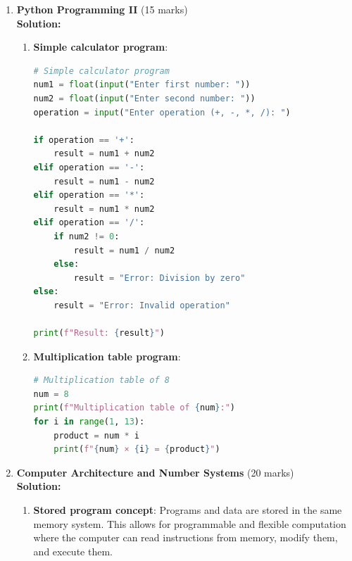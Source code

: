 \documentclass[12pt]{article}
\begin{document}
\begin{enumerate}[left=0pt, label=\bfseries Q\arabic*., start=1]
\begin{enumerate}[label=(\alph*)]
        \item \textbf{Can -132 be represented in 8-bit?}:
        \begin{align*}
        \text{Range for signed 8-bit} &= -2^{7} \text{ to } 2^{7}-1 \\
        &= -128 \text{ to } 127 \\
        -132 &< -128 \\
        \text{Answer} &= \boxed{\text{No, -132 is outside the representable range of -128 to 127}}
        \end{align*}
    \end{enumerate}

    \item \textbf{Python Programming II} \hfill (15 marks)\\
    \textbf{Solution:}
    \begin{enumerate}[label=(\alph*)]
        \item \textbf{Simple calculator program}:
        \begin{lstlisting}[language=Python]
# Simple calculator program
num1 = float(input("Enter first number: "))
num2 = float(input("Enter second number: "))
operation = input("Enter operation (+, -, *, /): ")

if operation == '+':
    result = num1 + num2
elif operation == '-':
    result = num1 - num2
elif operation == '*':
    result = num1 * num2
elif operation == '/':
    if num2 != 0:
        result = num1 / num2
    else:
        result = "Error: Division by zero"
else:
    result = "Error: Invalid operation"

print(f"Result: {result}")
        \end{lstlisting}
        
        \item \textbf{Multiplication table program}:
        \begin{lstlisting}[language=Python]
# Multiplication table of 8
num = 8
print(f"Multiplication table of {num}:")
for i in range(1, 13):
    product = num * i
    print(f"{num} × {i} = {product}")
        \end{lstlisting}
    \end{enumerate}

    \item \textbf{Computer Architecture and Number Systems} \hfill (20 marks)\\
    \textbf{Solution:}
    \begin{enumerate}[label=(\alph*)]
        \item \textbf{Stored program concept}: Programs and data are stored in the same memory system. This allows for programmable and flexible computation where the computer can read instructions from memory, modify them, and execute them.
        

\end{enumerate}
\end{enumerate}
\end{document}
